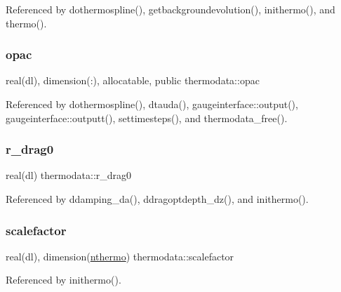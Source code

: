 Referenced by dothermospline(), getbackgroundevolution(), inithermo(), and thermo().

\mbox{\label{namespacethermodata_af824d4275dd6ae8475c82829c96c505c}} 
\subsubsection{\texorpdfstring{opac}{opac}}
{\footnotesize\ttfamily real(dl), dimension(\+:), allocatable, public thermodata\+::opac}



Referenced by dothermospline(), dtauda(), gaugeinterface\+::output(), gaugeinterface\+::outputt(), settimesteps(), and thermodata\+\_\+free().

\mbox{\label{namespacethermodata_a75e62e760e36ea9df5293d2f0141edff}} 
\subsubsection{\texorpdfstring{r\+\_\+drag0}{r\_drag0}}
{\footnotesize\ttfamily real(dl) thermodata\+::r\+\_\+drag0\hspace{0.3cm}{\ttfamily [private]}}



Referenced by ddamping\+\_\+da(), ddragoptdepth\+\_\+dz(), and inithermo().

\mbox{\label{namespacethermodata_a6f460accce66697aeae2188276198cdb}} 
\subsubsection{\texorpdfstring{scalefactor}{scalefactor}}
{\footnotesize\ttfamily real(dl), dimension(\mbox{\hyperlink{namespacethermodata_ab5a6325bede2b0cce4e867e9e1e18215}{nthermo}}) thermodata\+::scalefactor\hspace{0.3cm}{\ttfamily [private]}}



Referenced by inithermo().

\mbox{\label{namespacethermodata_a31169ba47074359a9820a44600d7628b}} 

